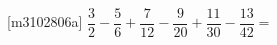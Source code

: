 [m3102806a]\quad
$\dfrac{3}{2}-\dfrac{5}{6}+\dfrac{7}{12}-\dfrac{9}{20}+\dfrac{11}{30}-\dfrac{13}{42}=$
\par